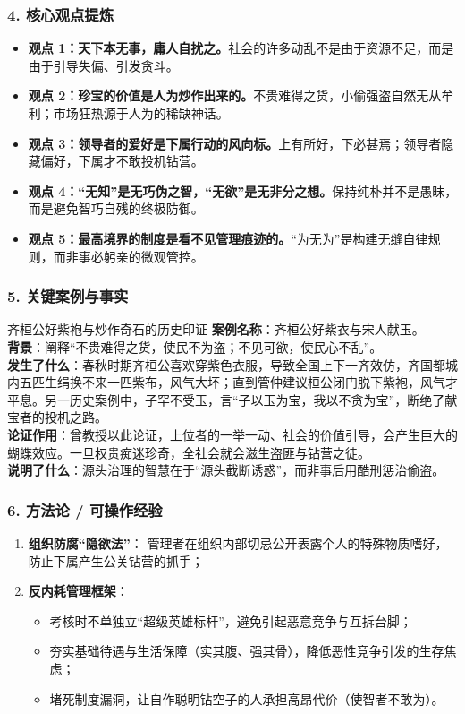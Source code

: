 \subsubsection{4. 核心观点提炼}
\begin{itemize}
    \item \textbf{观点 1：天下本无事，庸人自扰之。}社会的许多动乱不是由于资源不足，而是由于引导失偏、引发贪斗。
    \item \textbf{观点 2：珍宝的价值是人为炒作出来的。}不贵难得之货，小偷强盗自然无从牟利；市场狂热源于人为的稀缺神话。
    \item \textbf{观点 3：领导者的爱好是下属行动的风向标。}上有所好，下必甚焉；领导者隐藏偏好，下属才不敢投机钻营。
    \item \textbf{观点 4：“无知”是无巧伪之智，“无欲”是无非分之想。}保持纯朴并不是愚昧，而是避免智巧自残的终极防御。
    \item \textbf{观点 5：最高境界的制度是看不见管理痕迹的。}“为无为”是构建无缝自律规则，而非事必躬亲的微观管控。
\end{itemize}

\subsubsection{5. 关键案例与事实}
\begin{CaseBox}{齐桓公好紫袍与炒作奇石的历史印证}
\textbf{案例名称}：齐桓公好紫衣与宋人献玉。\\
\textbf{背景}：阐释“不贵难得之货，使民不为盗；不见可欲，使民心不乱”。\\
\textbf{发生了什么}：春秋时期齐桓公喜欢穿紫色衣服，导致全国上下一齐效仿，齐国都城内五匹生绢换不来一匹紫布，风气大坏；直到管仲建议桓公闭门脱下紫袍，风气才平息。另一历史案例中，子罕不受玉，言“子以玉为宝，我以不贪为宝”，断绝了献宝者的投机之路。\\
\textbf{论证作用}：曾教授以此论证，上位者的一举一动、社会的价值引导，会产生巨大的蝴蝶效应。一旦权贵痴迷珍奇，全社会就会滋生盗匪与钻营之徒。\\
\textbf{说明了什么}：源头治理的智慧在于“源头截断诱惑”，而非事后用酷刑惩治偷盗。
\end{CaseBox}

\subsubsection{6. 方法论 / 可操作经验}
\begin{enumerate}
    \item \textbf{组织防腐“隐欲法”}：
    管理者在组织内部切忌公开表露个人的特殊物质嗜好，防止下属产生公关钻营的抓手；
    \item \textbf{反内耗管理框架}：
    \begin{itemize}
        \item 考核时不单独立“超级英雄标杆”，避免引起恶意竞争与互拆台脚；
        \item 夯实基础待遇与生活保障（实其腹、强其骨），降低恶性竞争引发的生存焦虑；
        \item 堵死制度漏洞，让自作聪明钻空子的人承担高昂代价（使智者不敢为）。
    \end{itemize}
\end{enumerate}

